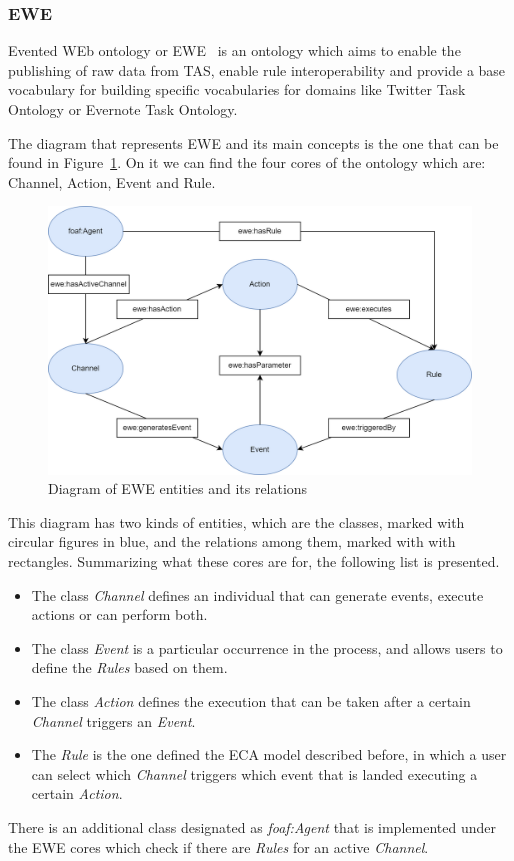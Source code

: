 \subsubsection{EWE}
Evented WEb ontology or EWE~\cite{EWEOntol89:online} is an ontology which aims to enable the publishing of raw data from TAS, enable rule interoperability and provide a base vocabulary for building specific vocabularies for domains like Twitter Task Ontology or Evernote Task Ontology.

The diagram that represents EWE and its main concepts is the one that can be found in Figure~\ref{fig:ewediagram}. On it we can find the four cores of the ontology which are: Channel, Action, Event and Rule. 

\begin{figure}[!htp]
    \centering
    \includegraphics[scale=0.28]{img/state-of-art/EWEdiagram.png}
    \caption{Diagram of EWE entities and its relations}
    \label{fig:ewediagram}
\end{figure}

This diagram has two kinds of entities, which are the classes, marked with circular figures in blue, and the relations among them, marked with with rectangles. Summarizing what these cores are for, the following list is presented.

\begin{itemize}
    \item The class \textit{Channel} defines an individual that can generate events, execute actions or can perform both.
    \item The class \textit{Event} is a particular occurrence in the process, and allows users to define the \textit{Rules} based on them.
    \item The class \textit{Action} defines the execution that can be taken after a certain \textit{Channel} triggers an \textit{Event}.
    \item The \textit{Rule} is the one defined the ECA model described before, in which a user can select which \textit{Channel} triggers which event that is landed executing a certain \textit{Action}.
\end{itemize}
There is an additional class designated as \textit{foaf:Agent} that is implemented under the EWE cores which check if there are \textit{Rules} for an active\textit{ Channel}.



